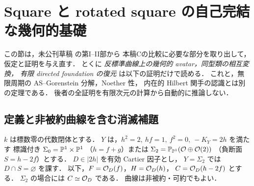 \section{Square と rotated square の自己完結な幾何的基礎}
\label{sec:qa-self-contained-foundations}

この節は，未公刊草稿 \cite{AvatarVSeven2026} の第I--II部から
本稿Cの比較に必要な部分を取り出して，仮定と証明を与え直す．
とくに \emph{反標準曲線上の幾何的 avatar，同型類の相互変換，
有限 directed foundation の復元} は以下の証明だけで読める．
これと，無限周期の AS--Gorenstein 分解，Noether 性，
内在的 Hilbert 関手の認識とは別の定理である．
後者の全証明を有限次元の計算から自動的に推論しない．

\subsection{定義と非被約曲線を含む消滅補題}

$k$ は標数零の代数閉体とする．
$Y$ は，$h^2=2,\ hf=1,\ f^2=0,\ -K_Y=2h$ を満たす
標識付き $\Sigma_0=\mathbb P^1\times\mathbb P^1$
（$h=f+g$）または
$\Sigma_2=\mathbb P_{\mathbb P^1}(\mathcal O\oplus\mathcal O(2))$
（負断面 $S=h-2f$）とする．
$D\in|2h|$ を有効 Cartier 因子とし，
$Y=\Sigma_2$ では $D\cap S=\varnothing$ を課す．
以下，$F=\mathcal O_D(f)$，$H=\mathcal O_D(h)$，
$C=\mathcal O_D(h-2f)$ とする．
$\Sigma_2$ の場合には $C\simeq\mathcal O_D$ である．
曲線は非被約・可約でもよい．

